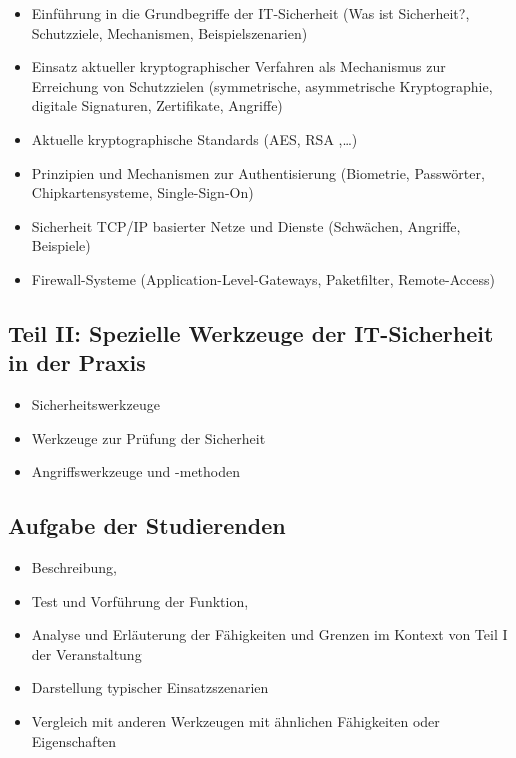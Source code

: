 \begin{itemize}
\tightlist
\item
  Einführung in die Grundbegriffe der IT-Sicherheit (Was ist
  Sicherheit?, Schutzziele, Mechanismen, Beispielszenarien)
\item
  Einsatz aktueller kryptographischer Verfahren als Mechanismus zur
  Erreichung von Schutzzielen (symmetrische, asymmetrische
  Kryptographie, digitale Signaturen, Zertifikate, Angriffe)
\item
  Aktuelle kryptographische Standards (AES, RSA ,\ldots{})
\item
  Prinzipien und Mechanismen zur Authentisierung (Biometrie, Passwörter,
  Chipkartensysteme, Single-Sign-On)
\item
  Sicherheit TCP/IP basierter Netze und Dienste (Schwächen, Angriffe,
  Beispiele)
\item
  Firewall-Systeme (Application-Level-Gateways, Paketfilter,
  Remote-Access)
\end{itemize}

\subsection*{Teil II: Spezielle Werkzeuge der IT-Sicherheit in der
Praxis}\label{teil-ii-spezielle-werkzeuge-der-it-sicherheit-in-der-praxis}

\begin{itemize}
\tightlist
\item
  Sicherheitswerkzeuge
\item
  Werkzeuge zur Prüfung der Sicherheit
\item
  Angriffswerkzeuge und -methoden
\end{itemize}

\subsection*{Aufgabe der Studierenden}\label{aufgabe-der-studierenden}

\begin{itemize}
\tightlist
\item
  Beschreibung,
\item
  Test und Vorführung der Funktion,
\item
  Analyse und Erläuterung der Fähigkeiten und Grenzen im Kontext von
  Teil I der Veranstaltung
\item
  Darstellung typischer Einsatzszenarien
\item
  Vergleich mit anderen Werkzeugen mit ähnlichen Fähigkeiten oder
  Eigenschaften
\end{itemize}


